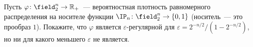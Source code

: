 Пусть $\varphi\colon \field_2^n \to \mathbb{R}_+$~--- вероятностная плотность равномерного распределения
на носителе функции $\IP_n\colon \field_2^n \to \{0, 1\}$ (носитель~--- это прообраз $1$). Покажите, что
$\varphi$ является $\varepsilon$-регулярной для $\varepsilon = 2^{-n / 2} / (1 - 2^{-n / 2})$, но ни для
какого меньшего $\varepsilon$ не является.